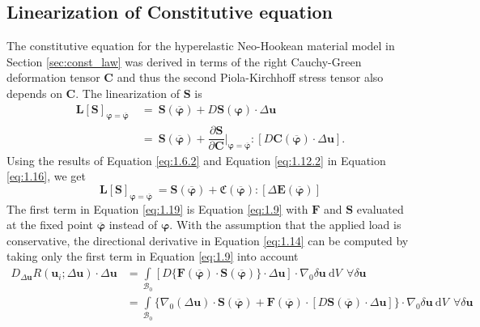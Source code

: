 \documentclass[11pt,a4paper,final]{article}
\begin{document}
\subsection{\textbf{Linearization of Constitutive equation}}
The constitutive equation for the hyperelastic Neo-Hookean material model in Section \eqref{sec:const_law} was derived in terms of the right Cauchy-Green deformation tensor $\mathbf{C}$ and thus the second Piola-Kirchhoff stress tensor also depends on $\mathbf{C}$. The linearization of $\mathbf{S}$ is
\begin{align}
\mathbf{L}\left[ \mathbf{S} \right]_{\bm{\varphi} = \overline{\bm{\varphi}}} \ &= \ \mathbf{S}(\overline{\bm{\varphi}}) + D \mathbf{S}(\bm{\varphi}) \cdot \Delta\mathbf{u} \nonumber \\
&= \ \mathbf{S}(\overline{\bm{\varphi}}) + \dfrac{\partial \mathbf{S}}{\partial \mathbf{C}} \Big|_{\bm{\varphi} = \overline{\bm{\varphi}}} : \left[ D \mathbf{C}(\overline{\bm{\varphi}}) \cdot \Delta\mathbf{u} \right].
\label{eq:1.16}
\end{align}
Using the results of Equation \eqref{eq:1.6.2} and Equation \eqref{eq:1.12.2} in Equation \eqref{eq:1.16}, we get
\begin{equation}
\mathbf{L}\left[ \mathbf{S} \right]_{\bm{\varphi} = \overline{\bm{\varphi}}} \ = \mathbf{S}(\overline{\bm{\varphi}}) + \mathfrak{C}(\overline{\bm{\varphi}}) : \left[ \Delta \mathbf{E}(\overline{\bm{\varphi}}) \right]
\label{eq:1.19}
\end{equation} \newline 
The first term in Equation \eqref{eq:1.19} is Equation \eqref{eq:1.9} with $\mathbf{F}$ and $\mathbf{S}$ evaluated at the fixed point $\overline{\bm{\varphi}}$ instead of $\bm{\varphi}$. With the assumption that the applied load is conservative, the directional derivative in Equation \eqref{eq:1.14} can be computed by taking only the first term in Equation \eqref{eq:1.9} into account
\begin{align}
D_{\Delta\mathbf{u}} R(\mathbf{u}_i; \Delta \mathbf{u}) \cdot \Delta\mathbf{u} &= \int\limits_{\mathcal{B}_0} \left[ D \{ \mathbf{F}(\overline{\bm{\varphi}}) \cdot \mathbf{S}(\overline{\bm{\varphi}})\} \cdot \Delta\mathbf{u} \right] \cdot \nabla_0 \delta\mathbf{u} \ \mathrm{d}V \ \ \forall \delta\mathbf{u} \nonumber \\
&= \int\limits_{\mathcal{B}_0} \Big\lbrace \nabla_0 (\Delta\mathbf{u}) \cdot \mathbf{S}(\overline{\bm{\varphi}}) + \mathbf{F}(\overline{\bm{\varphi}}) \cdot \left[ D \mathbf{S}(\overline{\bm{\varphi}}) \cdot \Delta\mathbf{u} \right] \Big\rbrace \cdot \nabla_0 \delta\mathbf{u} \ \mathrm{d}V \ \ \forall \delta\mathbf{u}
\label{eq:1.20}
\end{align}
\end{document}
